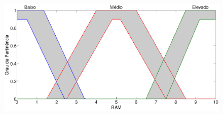 \documentclass[tcc,capa]{texufpel}
\begin{document}
\begin{figure}[h]
\centering
\includegraphics[scale=0.15]{images/Plot2_RAM.png}
 \label{fig:RAM_tipo1e2}
\end{figure}
\end{document}
